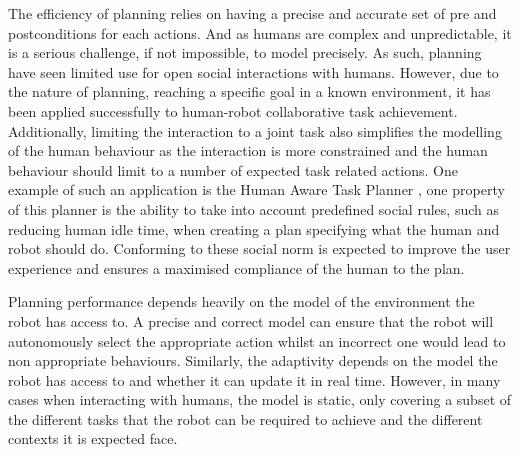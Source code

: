     
    The efficiency of planning relies on having a precise and accurate set of pre and postconditions for each actions. And as humans are complex and unpredictable, it is a serious challenge, if not impossible, to model precisely. As such, planning have seen limited use for open social interactions with humans. However, due to the nature of planning, reaching a specific goal in a known environment, it has been applied successfully to human-robot collaborative task achievement. Additionally, limiting the interaction to a joint task also simplifies the modelling of the human behaviour as the interaction is more constrained and the human behaviour should limit to a number of expected task related actions. One example of such an application is the Human Aware Task Planner \citep{alili2009task}, one property of this planner is the ability to take into account predefined social rules, such as reducing human idle time, when creating a plan specifying what the human and robot should do. Conforming to these social norm is expected to improve the user experience and ensures a maximised compliance of the human to the plan.
    
    Planning performance depends heavily on the model of the environment the robot has access to. A precise and correct model can ensure that the robot will autonomously select the appropriate action whilst an incorrect one would lead to non appropriate behaviours. Similarly, the adaptivity depends on the model the robot has access to and whether it can update it in real time. However, in many cases when interacting with humans, the model is static, only covering a subset of the different tasks that the robot can be required to achieve and the different contexts it is expected face.
    
    
